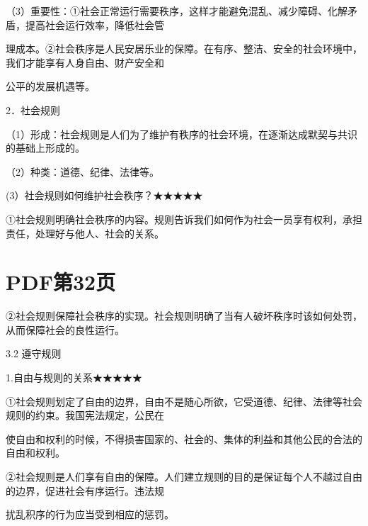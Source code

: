 \documentclass[lang=cn,11pt]{elegantbook}
\newcommand{\daofasym}[1]{{\daofasymbolfont #1}}
\newcommand{\daofasym}[1]{#1}
\begin{document}
（3）重要性：\daofasym{①}社会正常运行需要秩序，这样才能避免混乱、减少障碍、化解矛盾，提高社会运行效率，降低社会管\par

理成本。\daofasym{②}社会秩序是人民安居乐业的保障。在有序、整洁、安全的社会环境中，我们才能享有人身自由、财产安全和\par

公平的发展机遇等。\par

2．社会规则\par

（1）形成：社会规则是人们为了维护有秩序的社会环境，在逐渐达成默契与共识的基础上形成的。\par

（2）种类：道德、纪律、法律等。\par

(3）社会规则如何维护社会秩序？\daofasym{★}\daofasym{★}\daofasym{★}\daofasym{★}\daofasym{★}\par

\daofasym{①}社会规则明确社会秩序的内容。规则告诉我们如何作为社会一员享有权利，承担责任，处理好与他人、社会的关系。\par


\section*{PDF第32页}

\daofasym{②}社会规则保障社会秩序的实现。社会规则明确了当有人破坏秩序时该如何处罚，从而保障社会的良性运行。\par

3.2 遵守规则\par

1.自由与规则的关系\daofasym{★}\daofasym{★}\daofasym{★}\daofasym{★}\daofasym{★}\par

\daofasym{①}社会规则划定了自由的边界，自由不是随心所欲，它受道德、纪律、法律等社会规则的约束。我国宪法规定，公民在\par

使自由和权利的时候，不得损害国家的、社会的、集体的利益和其他公民的合法的自由和权利。\par

\daofasym{②}社会规则是人们享有自由的保障。人们建立规则的目的是保证每个人不越过自由的边界，促进社会有序运行。违法规\par

扰乱积序的行为应当受到相应的惩罚。\par
\end{document}
